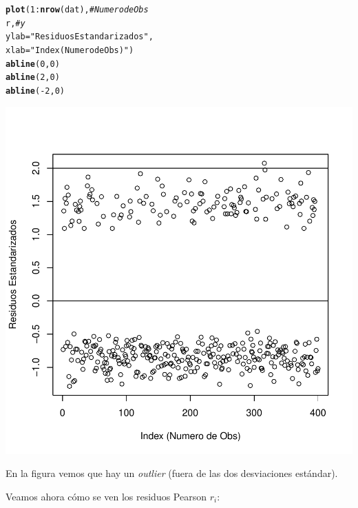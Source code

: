 \documentclass[onesided]{article}\usepackage[]{graphicx}\usepackage[]{color}
\makeatletter
\def\maxwidth{ %
  \ifdim\Gin@nat@width>\linewidth
    \linewidth
  \else
    \Gin@nat@width
  \fi
}
\newcommand{\hlnum}[1]{\textcolor[rgb]{0.686,0.059,0.569}{#1}}%
\newcommand{\hlstr}[1]{\textcolor[rgb]{0.192,0.494,0.8}{#1}}%
\newcommand{\hlcom}[1]{\textcolor[rgb]{0.678,0.584,0.686}{\textit{#1}}}%
\newcommand{\hlopt}[1]{\textcolor[rgb]{0,0,0}{#1}}%
\newcommand{\hlstd}[1]{\textcolor[rgb]{0.345,0.345,0.345}{#1}}%
\newcommand{\hlkwc}[1]{\textcolor[rgb]{0.333,0.667,0.333}{#1}}%
\newcommand{\hlkwd}[1]{\textcolor[rgb]{0.737,0.353,0.396}{\textbf{#1}}}%
\newenvironment{kframe}{%
 \def\at@end@of@kframe{}%
 \ifinner\ifhmode%
  \def\at@end@of@kframe{\end{minipage}}%
  \begin{minipage}{\columnwidth}%
 \fi\fi%
 \def\FrameCommand##1{\hskip\@totalleftmargin \hskip-\fboxsep
 \colorbox{shadecolor}{##1}\hskip-\fboxsep
     \hskip-\linewidth \hskip-\@totalleftmargin \hskip\columnwidth}%
 \MakeFramed {\advance\hsize-\width
   \@totalleftmargin\z@ \linewidth\hsize
   \@setminipage}}%
 {\par\unskip\endMakeFramed%
 \at@end@of@kframe}
\newenvironment{knitrout}{}{} %
\makeatother
\begin{document}
\begin{knitrout}
\color{fgcolor}\begin{kframe}
\begin{alltt}
\hlkwd{plot}\hlstd{(}\hlnum{1}\hlopt{:}\hlkwd{nrow}\hlstd{(dat),} \hlcom{# Numero de Obs}
     \hlstd{r,} \hlcom{# y}
     \hlkwc{ylab}\hlstd{=}\hlstr{"Residuos Estandarizados"}\hlstd{,}
     \hlkwc{xlab}\hlstd{=}\hlstr{"Index (Numero de Obs)"}\hlstd{)}
\hlkwd{abline}\hlstd{(}\hlnum{0}\hlstd{,} \hlnum{0}\hlstd{)}
\hlkwd{abline}\hlstd{(}\hlnum{2}\hlstd{,} \hlnum{0}\hlstd{)}
\hlkwd{abline}\hlstd{(}\hlopt{-}\hlnum{2}\hlstd{,} \hlnum{0}\hlstd{)}
\end{alltt}
\end{kframe}

{\centering \includegraphics[width=\maxwidth]{figure/rindexplot-1} 

}



\end{knitrout}

En la figura vemos que hay un \emph{outlier} (fuera de las dos desviaciones est\'andar). 

Veamos ahora c\'omo se ven los residuos Pearson $r_{i}$:
\end{document}
